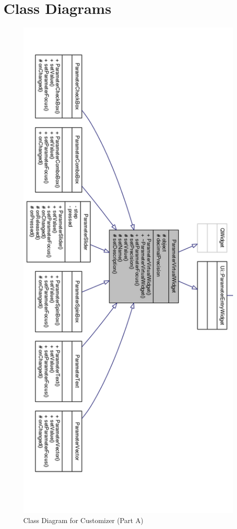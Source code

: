 \section{Class Diagrams}
\begin{figure}
    \centering
    \includegraphics[width=0.5\linewidth]{images/collaborative1}
    \caption{Class Diagram for Customizer (Part A) }
    \label{fig:collaborative1}
\end{figure}

